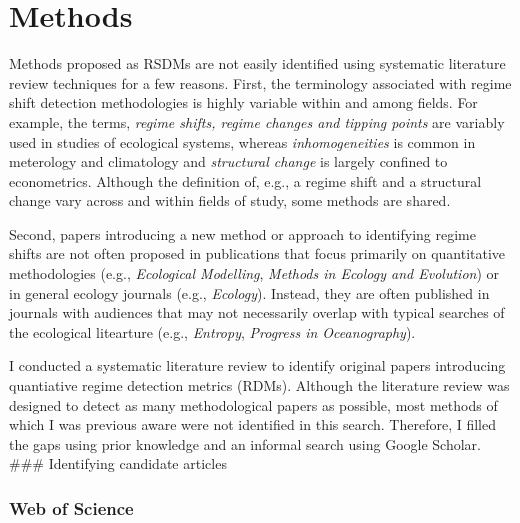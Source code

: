 \documentclass[12pt,twoside,openany]{reedthesis}
\begin{document}
\section{Methods}\label{methods}

Methods proposed as RSDMs are not easily identified using systematic
literature review techniques for a few reasons. First, the terminology
associated with regime shift detection methodologies is highly variable
within and among fields. For example, the terms, \emph{regime shifts,
regime changes and tipping points} are variably used in studies of
ecological systems, whereas \emph{inhomogeneities} is common in
meterology and climatology and \emph{structural change} is largely
confined to econometrics. Although the definition of, e.g., a regime
shift and a structural change vary across and within fields of study,
some methods are shared.

Second, papers introducing a new method or approach to identifying
regime shifts are not often proposed in publications that focus
primarily on quantitative methodologies (e.g., \emph{Ecological
Modelling}, \emph{Methods in Ecology and Evolution}) or in general
ecology journals (e.g., \emph{Ecology}). Instead, they are often
published in journals with audiences that may not necessarily overlap
with typical searches of the ecological litearture (e.g.,
\emph{Entropy}, \emph{Progress in Oceanography}).

I conducted a systematic literature review to identify original papers
introducing quantiative regime detection metrics (RDMs). Although the
literature review was designed to detect as many methodological papers
as possible, most methods of which I was previous aware were not
identified in this search. Therefore, I filled the gaps using prior
knowledge and an informal search using Google Scholar. \#\#\#
Identifying candidate articles

\subsubsection{Web of Science}\label{web-of-science}
\end{document}
